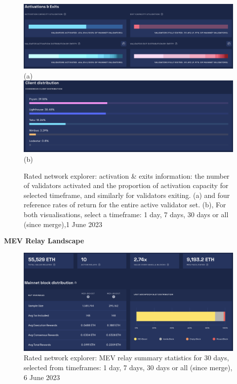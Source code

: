 \documentclass[UTF8]{article}
\begin{document}
\begin{figure}[htbp]
\begin{center}
\includegraphics[width=\linewidth]{images/ratednw3}\\
(a)
\includegraphics[width=\linewidth]{images/ratednw4}\\
(b)
\caption{Rated network explorer: activation \& exits information: the number of validators activated and the proportion of activation capacity for selected timeframe, and similarly for validators exiting.  (a) and four reference rates of return for the entire active validator set. (b), For both visualisations, select a timeframe: 1 day, 7 days, 30 days or all (since merge),1 June 2023}
\label{fig:ratednw4}
\end{center}
\end{figure}

\clearpage
\textbf{MEV Relay Landscape}\\
\begin{figure}[htbp]
\begin{center}
\includegraphics[width=\linewidth]{images/ratedrelay1}
\caption{Rated network explorer: MEV relay summary statistics for 30 days, selected from timeframes: 1 day, 7 days, 30 days or all (since merge), 6 June 2023}
\label{fig:ratedrelay1}
\end{center}
\end{figure}
\end{document}
